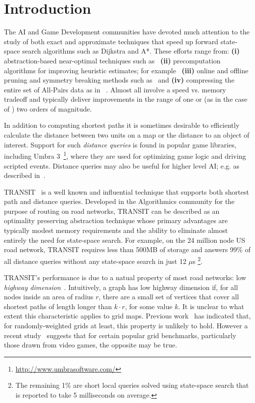 \section{Introduction}
\label{sec:introduction}
The AI and Game Development communities have devoted much attention to the study
of both exact and approximate techniques that speed up forward state-space search algorithms
such as Dijkstra and A*.
These efforts range from: \textbf{(i)} abstraction-based near-optimal techniques such as~\cite{botea04,sturtevant07}
\textbf{(ii)} precomputation algorithms for improving heuristic estimates; for example~\cite{sturtevant09,goldenberg10}
\textbf{(iii)} online and offline pruning and symmetry breaking methods such as~\cite{bjornsson06,pochter09,harabor11b} and
\textbf{(iv)} compressing the entire set of All-Pairs data as in ~\cite{botea11}.
Almost all involve a speed vs. memory tradeoff and typically deliver improvements in the
range of one or (as in the case of \cite{botea11}) two orders of magnitude.

In addition to computing shortest paths it is sometimes desirable to efficiently
calculate the distance between two units on a map or the distance to an object
of interest.  Support for such \emph{distance queries} is found in popular game
libraries, including Umbra 3~\footnote{\url{http://www.umbrasoftware.com/}},
where they are used for optimizing game logic and driving scripted events.
Distance queries may also be useful for higher level AI; e.g. as described
in~\cite{champandard09}.

TRANSIT~\cite{bast06} is a well known and influential technique that supports both shortest
path and distance queries.  Developed in the Algorithmics community for the
purpose of routing on road networks, TRANSIT can be described as an optimality
preserving abstraction technique whose primary advantages are typically modest
memory requirements and the ability to eliminate almost entirely the need for
state-space search.  For example, on the 24 million node US road network,
TRANSIT requires less than 500MB of storage and answers 99\% of all distance
queries without any state-space search in just 12 $\mu$s \footnote{The
remaining 1\% are short local queries solved using state-space search that is
reported to take 5 milliseconds on average.}.

TRANSIT's performance is due to a natual property of most road
networks: low \emph{highway dimension}~\cite{abraham10}.
Intuitively, a graph has low highway dimension if, for all nodes inside an area
of radius $r$, there are a small set of vertices that cover all shortest paths
of length longer than $k \cdot r$, for some value $k$.  It is unclear to what extent this characteristic
applies to grid maps. Previous work~\cite{goldberg06} has indicated that, for
randomly-weighted grids at least, this property is unlikely to hold.
However a recent study~\cite{sturtevant2012benchmarks} suggests that for certain
popular grid benchmarks, particularly those drawn from video games, the opposite
may be true.

